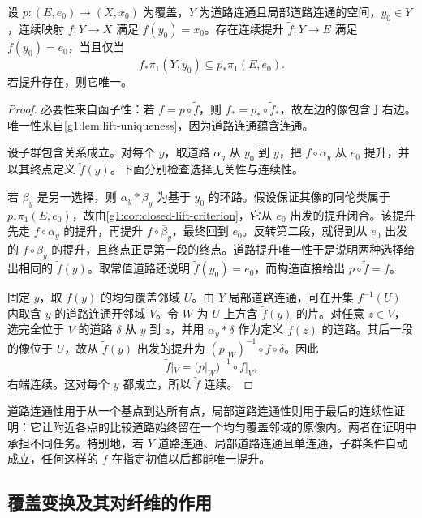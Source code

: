 \begin{theorem}\label{g1:thm:lifting-criterion}
	设 \(p:(E,e_0)\to(X,x_0)\) 为覆盖，\(Y\) 为道路连通且局部道路连通的空间，\(y_0\in Y\)，连续映射 \(f:Y\to X\) 满足 \(f(y_0)=x_0\)。存在连续提升 \(\widetilde f:Y\to E\) 满足 \(\widetilde f(y_0)=e_0\)，当且仅当
	\[
		f_*\pi_1(Y,y_0)\subseteq p_*\pi_1(E,e_0).
	\]
	若提升存在，则它唯一。
\end{theorem}
\begin{proof}
	必要性来自函子性：若 \(f=p\circ\widetilde f\)，则 \(f_*=p_*\circ\widetilde f_*\)，故左边的像包含于右边。唯一性来自\cref{g1:lem:lift-uniqueness}，因为道路连通蕴含连通。

	设子群包含关系成立。对每个 \(y\)，取道路 \(\alpha_y\) 从 \(y_0\) 到 \(y\)，把 \(f\circ\alpha_y\) 从 \(e_0\) 提升，并以其终点定义 \(\widetilde f(y)\)。下面分别检查选择无关性与连续性。

	若 \(\beta_y\) 是另一选择，则 \(\alpha_y*\bar\beta_y\) 为基于 \(y_0\) 的环路。假设保证其像的同伦类属于 \(p_*\pi_1(E,e_0)\)，故由\cref{g1:cor:closed-lift-criterion}，它从 \(e_0\) 出发的提升闭合。该提升先走 \(f\circ\alpha_y\) 的提升，再提升 \(f\circ\bar\beta_y\)，最终回到 \(e_0\)。反转第二段，就得到从 \(e_0\) 出发的 \(f\circ\beta_y\) 的提升，且终点正是第一段的终点。道路提升唯一性于是说明两种选择给出相同的 \(\widetilde f(y)\)。取常值道路还说明 \(\widetilde f(y_0)=e_0\)，而构造直接给出 \(p\circ\widetilde f=f\)。

	固定 \(y\)，取 \(f(y)\) 的均匀覆盖邻域 \(U\)。由 \(Y\) 局部道路连通，可在开集 \(f^{-1}(U)\) 内取含 \(y\) 的道路连通开邻域 \(V\)。令 \(W\) 为 \(U\) 上方含 \(\widetilde f(y)\) 的片。对任意 \(z\in V\)，选完全位于 \(V\) 的道路 \(\delta\) 从 \(y\) 到 \(z\)，并用 \(\alpha_y*\delta\) 作为定义 \(\widetilde f(z)\) 的道路。其后一段的像位于 \(U\)，故从 \(\widetilde f(y)\) 出发的提升为 \((p|_W)^{-1}\circ f\circ\delta\)。因此
	\[
		\widetilde f|_V=(p|_W)^{-1}\circ f|_V,
	\]
	右端连续。这对每个 \(y\) 都成立，所以 \(\widetilde f\) 连续。
\end{proof}

道路连通性用于从一个基点到达所有点，局部道路连通性则用于最后的连续性证明：它让附近各点的比较道路始终留在一个均匀覆盖邻域的原像内。两者在证明中承担不同任务。特别地，若 \(Y\) 道路连通、局部道路连通且单连通，子群条件自动成立，任何这样的 \(f\) 在指定初值以后都能唯一提升。

\subsection{覆盖变换及其对纤维的作用}
\label{g1:subsec:0503:04}

